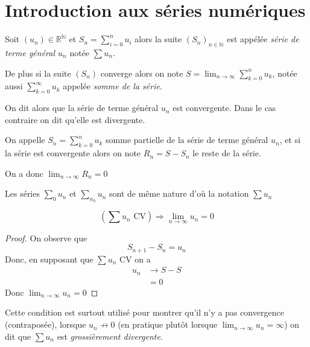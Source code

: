 \documentclass[11pt,colorlinks]{book}
\theoremstyle{mytheoremstyle}
\theoremstyle{mytheoremstyle}
\theoremstyle{mytheoremstyle}
\theoremstyle{mytheoremstyle}
\theoremstyle{mytheoremstyle}
\theoremstyle{mytheoremstyle}
\theoremstyle{mytheoremstyle}
\theoremstyle{mytheoremstyle}
\theoremstyle{myproblemstyle}
\def\mbb#1{\mathbb{#1}}
\def\bN{\mbb{N}}
\def\bR{\mbb{R}}
\def\ln{\lim_{n \to \infty}}
\begin{document}
\section{Introduction aux séries numériques}
\begin{definition}
  Soit $(u_n) \in \bR^{\bN}$ et $S_n = \sum_{i=0}^n u_i$ alors la suite $(S_n)_{n \in \bN}$ est appélée \textit{série de terme général $u_n$} 
  notée $\sum u_n$.
  
  De plus si la suite $(S_n)$ converge alors on note $S = \ln \sum_{k=0}^n u_k$, notée aussi $\sum_{k=0}^{\infty} u_k$ 
  appelée \textit{somme de la série}. 
  
  On dit alors que la série de terme général $u_n$ est convergente. Dans le cas contraire on dit qu'elle est divergente. 
\end{definition}
\begin{definition}
  On appelle $S_n = \sum_{k=0}^n u_k$ somme partielle de la série de terme général $u_n$, et si la série est convergente alors on note 
  $R_n = S - S_n$ le reste de la série.
\end{definition}
\begin{rmq}
  On a donc $\ln R_n = 0$
\end{rmq}
\begin{rmq}
  Les séries $\sum_{0} u_n$ et $\sum_{n_0} u_n$ sont de même nature d'où la notation $\sum u_n$ 
\end{rmq}
\begin{prop}
  \begin{equation*}
    \left(\sum u_n \text{ CV}\right) \Rightarrow \ln u_n = 0
  \end{equation*}

  
  \begin{proof}
    On observe que 
    \begin{equation*}
      S_{n+1} - S_n = u_n
    \end{equation*}
    Donc, en supposant que $\sum u_n$ CV on a 
    \begin{align*}
      u_n &\to S - S \\ 
          &= 0
    \end{align*}
    Donc $\ln u_n = 0$
  \end{proof}
\end{prop}
\begin{rmq}
  Cette condition est surtout utilisé pour montrer qu'il n'y a pas convergence (contraposée), lorsque $u_n \not\to 0$ 
  (en pratique plutôt lorsque $\ln u_n = \infty$) on dit que $\sum u_n$ est \textit{grossièrement divergente}.
\end{rmq}
\end{document}
